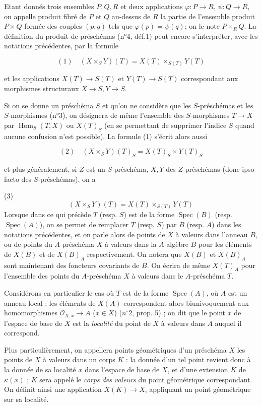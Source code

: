Etant donnés trois ensembles $P, Q, R$ et deux applications $\varphi : P \to R$, $\psi : Q \to R$, on appelle produit fibré de $P$ et $Q$ au-dessus de $R$ la partie de l'ensemble produit $P \times Q$ formée des couples $(p,q)$ tels que $\varphi(p) = \psi(q)$; on le note $P \times_R Q$. La définition du produit de préschémas (n°4, déf.1) peut encore s'interpréter, avec les notations précédentes, par la formule

$$(1) \quad (X \times_S Y)(T) = X(T) \times_{S(T)} Y(T)$$

et les applications $X(T) \to S(T)$ et $Y(T) \to S(T)$ correspondant aux morphismes structuraux $X \to S, Y \to S$.

Si on se donne un préschéma $S$ et qu'on ne considère que les $S$-préschémas et les $S$-morphismes (n°3), on désignera de même l'ensemble des $S$-morphismes $T \to X$ par $\operatorname{Hom}_S(T,X)$ ou $X(T)_S$ (en se permettant de supprimer l'indice $S$ quand aucune confusion n'est possible). La formule (1) s'écrit alors aussi

$$(2) \quad (X \times_S Y)(T)_S = X(T)_S \times Y(T)_S$$

et plus généralement, si $Z$ est un $S$-préschéma, $X, Y$ des $Z$-préschémas (donc ipso facto des $S$-préschémas), on a

\newpage


(3)
$$(X \times_S Y)(T) = X(T) \times_{S(T)} Y(T)$$
Lorsque dans ce qui précède $T$ (resp. $S$) est de la forme $\operatorname{Spec}(B)$ (resp. $\operatorname{Spec}(A)$), on se permet de remplacer $T$ (resp. $S$) par $B$ (resp. $A$) dans les notations précédentes, et on parle alors de points de $X$ à valeurs dans l'anneau $B$, ou de points du $A$-préschéma $X$ à valeurs dans la $A$-algèbre $B$ pour les éléments de $X(B)$ et de $X(B)_A$ respectivement. On notera que $X(B)$ et $X(B)_A$ sont maintenant des foncteurs covariants de $B$. On écrira de même $X(T)_A$ pour l'ensemble des points du $A$-préschéma $X$ à valeurs dans le $A$-préschéma $T$.

Considérons en particulier le cas où $T$ est de la forme $\operatorname{Spec}(A)$, où $A$ est un anneau local ; les éléments de $X(A)$ correspondent alors biunivoquement aux homomorphismes $\mathcal{O}_{X,x} \to A$ ($x \in X$) ($n^\circ 2$, prop. 5) ; on dit que le point $x$ de l'espace de base de $X$ est la \emph{localité} du point de $X$ à valeurs dans $A$ auquel il correspond.

Plus particulièrement, on appellera points géométriques d'un préschéma $X$ les points de $X$ à valeurs dans un corps $K$ : la donnée d'un tel point revient donc à la donnée de sa localité $x$ dans l'espace de base de $X$, et d'une extension $K$ de $\kappa(x)$ ; $K$ sera appelé le \emph{corps des valeurs} du point géométrique correspondant. On définit ainsi une application $X(K) \to X$, appliquant un point géométrique sur sa localité.

